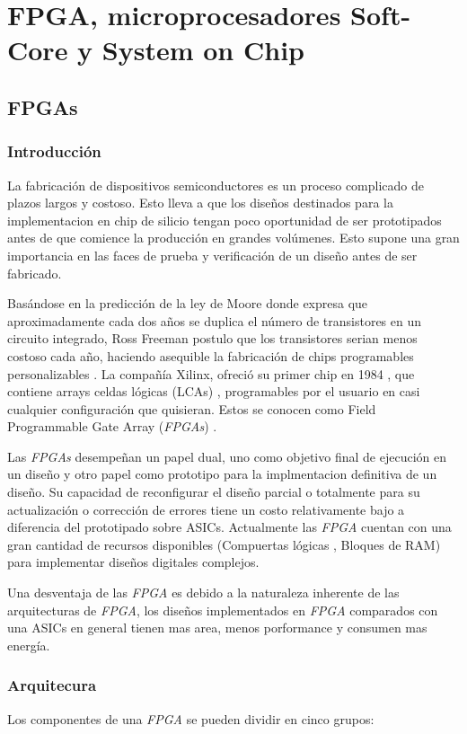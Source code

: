 
\chapter{FPGA, microprocesadores Soft-Core y System on Chip}
	

\section{FPGAs}

	\subsection{Introducción}
La fabricación de dispositivos semiconductores es un proceso complicado de plazos largos y costoso. Esto lleva a que los diseños destinados para la  implementacion en chip de silicio tengan poco oportunidad de ser prototipados antes de que comience la producción en grandes volúmenes. Esto supone una gran importancia  en las faces de prueba y verificación de un diseño antes de ser fabricado.

Basándose en la predicción de la ley de Moore donde expresa que aproximadamente cada dos años se duplica el número de transistores en un circuito integrado\cite{Etiqueta02}, Ross Freeman postulo que los transistores serian menos costoso cada año, haciendo asequible la fabricación de chips programables personalizables \cite{Etiqueta03}.
La compañía Xilinx, ofreció su primer chip en 1984 , que contiene arrays celdas lógicas (LCAs) , programables por el usuario en casi cualquier configuración que quisieran. Estos se conocen como Field Programmable Gate Array (\textit{FPGAs}) .

Las \textit{FPGAs} desempeñan un papel dual, uno como objetivo final de ejecución en un diseño y otro papel como prototipo para la implmentacion definitiva de un diseño. Su capacidad de reconfigurar el diseño parcial o totalmente para su actualización o corrección de errores tiene un costo relativamente bajo a diferencia del prototipado sobre ASICs.
Actualmente las \textit{FPGA} cuentan con una gran cantidad de recursos disponibles (Compuertas lógicas , Bloques de RAM) para implementar diseños digitales complejos.

Una desventaja de las \textit{FPGA}  es debido a la naturaleza inherente de las arquitecturas de \textit{FPGA}, los diseños implementados en \textit{FPGA} comparados con una ASICs en general tienen mas area, menos porformance y consumen mas energía.
		
	\subsection{Arquitecura}
Los componentes de una \textit{FPGA} se pueden dividir en cinco grupos:

